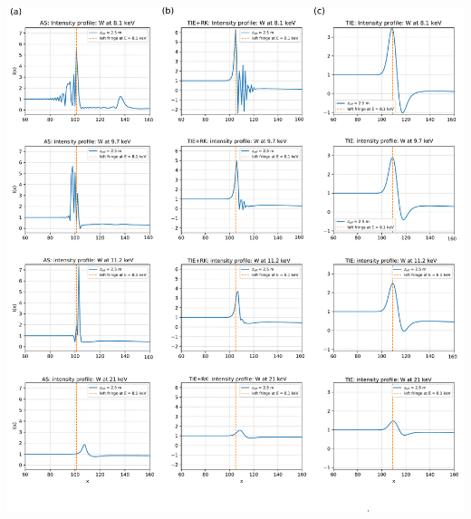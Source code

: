 \documentclass[10pt, a4paper, singlespacing]{report}
\newenvironment{Figure}
    {\par\medskip\noindent\minipage{\linewidth}}
    {\endminipage\par\medskip}
\begin{document}
\begin{Figure} 
 \centering
  \hspace*{-0.9cm}
 \includegraphics[width=\linewidth]{AS_vs_TIE+RK_vs_TIE_2.pdf}

\end{Figure}
\end{document}

